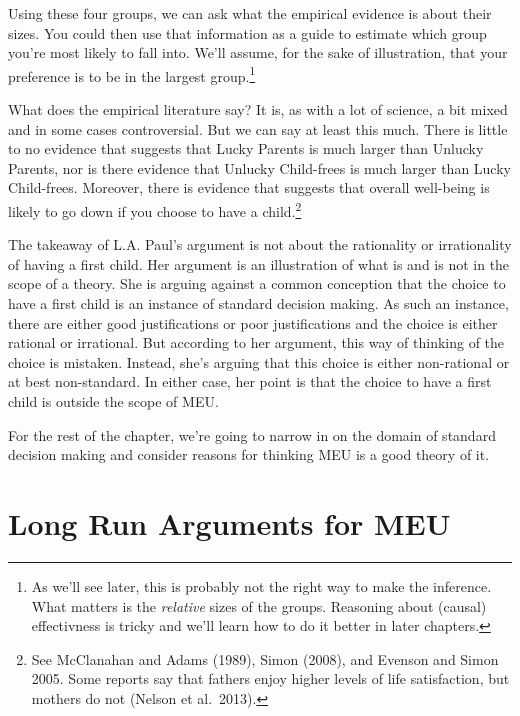 \documentclass[]{tufte-book}
\begin{document}
Using these four groups, we can ask what the empirical evidence is about their sizes. You could then use that information as a guide to estimate which group you're most likely to fall into. We'll assume, for the sake of illustration, that your preference is to be in the largest group.\footnote{As we'll see later, this is probably not the right way to make the inference. What matters is the \emph{relative} sizes of the groups. Reasoning about (causal) effectivness is tricky and we'll learn how to do it better in later chapters.}

What does the empirical literature say? It is, as with a lot of science, a bit mixed and in some cases controversial. But we can say at least this much. There is little to no evidence that suggests that Lucky Parents is much larger than Unlucky Parents, nor is there evidence that Unlucky Child-frees is much larger than Lucky Child-frees. Moreover, there is evidence that suggests that overall well-being is likely to go down if you choose to have a child.\footnote{See McClanahan and Adams (1989), Simon (2008), and Evenson and Simon 2005. Some reports say that fathers enjoy higher levels of life satisfaction, but mothers do not (Nelson et al.~2013).}

The takeaway of L.A. Paul's argument is not about the rationality or irrationality of having a first child. Her argument is an illustration of what is and is not in the scope of a theory. She is arguing against a common conception that the choice to have a first child is an instance of standard decision making. As such an instance, there are either good justifications or poor justifications and the choice is either rational or irrational. But according to her argument, this way of thinking of the choice is mistaken. Instead, she's arguing that this choice is either non-rational or at best non-standard. In either case, her point is that the choice to have a first child is outside the scope of MEU.

For the rest of the chapter, we're going to narrow in on the domain of standard decision making and consider reasons for thinking MEU is a good theory of it.

\hypertarget{long-run-arguments-for-meu}{%
\section{Long Run Arguments for MEU}\label{long-run-arguments-for-meu}}
\end{document}
